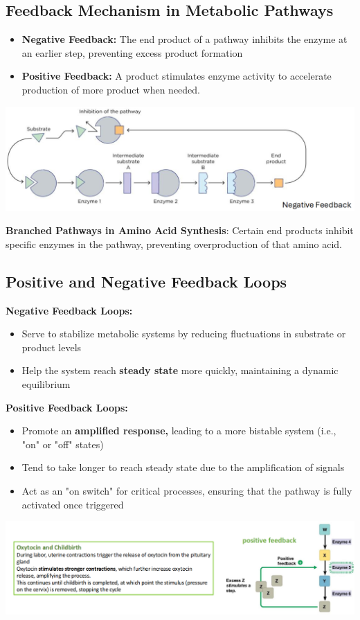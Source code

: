 \documentclass[10pt]{article}
\begin{document}
\subsection*{Feedback Mechanism in Metabolic Pathways}
\begin{itemize}
	\item \textbf{Negative Feedback:}  The end product of a pathway inhibits the enzyme at an earlier step, preventing excess product formation
	\item \textbf{Positive Feedback:}  A product stimulates enzyme activity to accelerate production of more product when needed.
\end{itemize}
\begin{center}
    \includegraphics*[width=\textwidth]{L2_3.png}
\end{center}
\textbf{Branched Pathways in Amino Acid Synthesis}: Certain end products inhibit specific enzymes in the pathway, preventing overproduction of that amino acid.

\subsection*{Positive and Negative Feedback Loops}
\textbf{Negative Feedback Loops:}  
\begin{itemize}
    \item Serve to stabilize metabolic systems by reducing fluctuations in substrate or product levels
    \item Help the system reach \textbf{steady state} more quickly, maintaining a dynamic equilibrium
\end{itemize}
\textbf{Positive Feedback Loops:}
\begin{itemize}
	\item Promote an \textbf{amplified response,} leading to a more bistable system (i.e., "on" or "off" states)
	\item Tend to take longer to reach steady state due to the amplification of signals
	\item Act as an "on switch" for critical processes, ensuring that the pathway is fully activated once triggered
\end{itemize}
\begin{center} 
	\includegraphics*[width=\textwidth]{L2_4.png}
\end{center}
\end{document}
